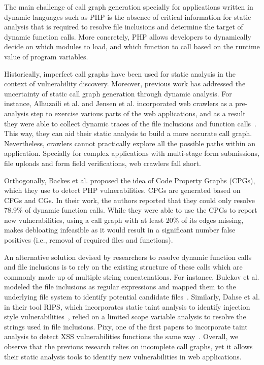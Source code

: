 The main challenge of call graph generation specially for applications written in dynamic languages such as PHP is the absence of critical information for static analysis that is required to resolve file inclusions and determine the target of dynamic function calls. 
More concretely, PHP allows developers to dynamically decide on which modules to load, and which function to call based on the runtime value of program variables. 

Historically, imperfect call graphs have been used for static analysis in the context of vulnerability discovery. 
Moreover, previous work has addressed the uncertainty of static call graph generation through dynamic analysis. 
For instance, Alhuzaili et al. and Jensen et al. incorporated web crawlers as a pre-analysis step to exercise various parts of the web applications, and as a result they were able to collect dynamic traces of the file inclusions and function calls~\cite{alhuzali2018navex, jensen2012thaps}. 
This way, they can aid their static analysis to build a more accurate call graph. 
Nevertheless, crawlers cannot practically explore all the possible paths within an application. 
Specially for complex applications with multi-stage form submissions, file uploads and form field verifications, web crawlers fall short. 

Orthogonally, Backes et al. proposed the idea of Code Property Graphs (CPGs), which they use to detect PHP vulnerabilities. 
CPGs are generated based on CFGs and CGs. 
In their work, the authors reported that they could only resolve 78.9\% of dynamic function calls. 
While they were able to use the CPGs to report new vulnerabilities, using a call graph with at least 20\% of its edges missing, makes debloating infeasible as it would result in a significant number false positives (i.e., removal of required files and functions). 

An alternative solution devised by researchers to resolve dynamic function calls and file inclusions is to rely on the existing structure of these calls which are commonly made up of multiple string concatenations. 
For instance, Bulekov et al. modeled the file inclusions as regular expressions and mapped them to the underlying file system to identify potential candidate files~\cite{saphire}. 
Similarly, Dahse et al. in their tool RIPS, which incorporates static taint analysis to identify injection style vulnerabilities~\cite{dahse2010rips}, relied on a limited scope variable analysis to resolve the strings used in file inclusions. 
Pixy, one of the first papers to incorporate taint analysis to detect XSS vulnerabilities functions the same way~\cite{jovanovic2006pixy}. 
Overall, we observe that the previous research relies on incomplete call graphs, yet it allows their static analysis tools to identify new vulnerabilities in web applications.


